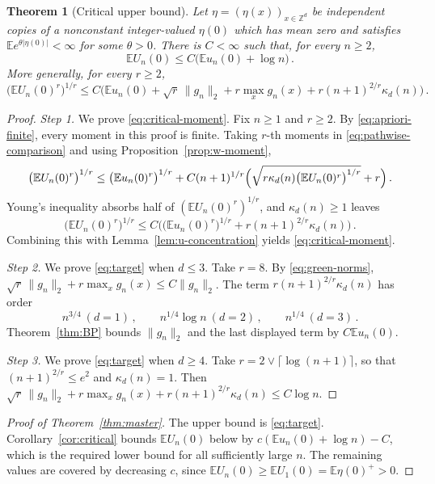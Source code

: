 \documentclass[11pt]{amsart}
\theoremstyle{plain}
\newtheorem{theorem}{Theorem}[section]
\theoremstyle{definition}
\newcommand{\Z}{\mathbb{Z}}
\newcommand{\E}{\mathbb{E}}
\begin{document}
\begin{theorem}[Critical upper bound]\label{thm:upper}
	Let $\eta=(\eta(x))_{x\in\Z^d}$ be independent copies of a nonconstant integer-valued
	$\eta(0)$ which has mean zero and satisfies $\E e^{\theta|\eta(0)|}<\infty$ for
	some $\theta>0$. There is $C<\infty$ such that, for every $n\geq2$,
	\begin{equation}\label{eq:target}
		\E U_n(0)\leq C\bigl(\E u_n(0)+\log n\bigr)\,.
	\end{equation}
	More generally, for every $r\geq2$,
	\begin{equation}\label{eq:critical-moment}
		\bigl(\E U_n(0)^r\bigr)^{1/r}
		\leq C\bigl(\E u_n(0)+\sqrt r\,\|g_n\|_2+r\max_xg_n(x)
		+r(n+1)^{2/r}\kappa_d(n)\bigr)\,.
	\end{equation}
\end{theorem}

\begin{proof}
	\smallskip
	\noindent\emph{Step 1.} We prove \eqref{eq:critical-moment}.
	Fix $n\geq1$ and $r\geq2$. By \eqref{eq:apriori-finite}, every
	moment in this proof is finite. Taking $r$-th moments in
	\eqref{eq:pathwise-comparison} and using Proposition~\ref{prop:w-moment},
	\[
		\bigl(\E U_n(0)^r\bigr)^{1/r}\leq\bigl(\E u_n(0)^r\bigr)^{1/r}
		+C(n+1)^{1/r}
		\Bigl(\sqrt{r\kappa_d(n)\bigl(\E U_n(0)^r\bigr)^{1/r}}+r\Bigr)\,.
	\]
	Young's inequality absorbs half of $(\E U_n(0)^r)^{1/r}$, and
	$\kappa_d(n)\geq1$ leaves
	\[
		\bigl(\E U_n(0)^r\bigr)^{1/r}\leq
		C\bigl(\bigl(\E u_n(0)^r\bigr)^{1/r}
		+r(n+1)^{2/r}\kappa_d(n)\bigr)\,.
	\]
	Combining this with Lemma~\ref{lem:u-concentration} yields
	\eqref{eq:critical-moment}.

	\smallskip
	\noindent\emph{Step 2.} We prove \eqref{eq:target} when $d\leq3$.
	Take $r=8$. By \eqref{eq:green-norms},
	$\sqrt r\,\|g_n\|_2+r\max_xg_n(x)\leq C\|g_n\|_2$. The term
	$r(n+1)^{2/r}\kappa_d(n)$ has order
	\[
		n^{3/4}\ (d=1)\,,\qquad n^{1/4}\log n\ (d=2)\,,\qquad n^{1/4}\ (d=3)\,.
	\]
	Theorem~\ref{thm:BP} bounds $\|g_n\|_2$ and the last displayed term by
	$C\E u_n(0)$.

	\smallskip
	\noindent\emph{Step 3.} We prove \eqref{eq:target} when $d\geq4$.
	Take
	$r=2\vee\lceil\log(n+1)\rceil$, so that $(n+1)^{2/r}\leq e^2$
	and $\kappa_d(n)=1$. Then
	$\sqrt r\,\|g_n\|_2+r\max_xg_n(x)+r(n+1)^{2/r}\kappa_d(n)\leq C\log n$.
\end{proof}

\begin{proof}[Proof of Theorem~\ref{thm:master}]
	The upper bound is \eqref{eq:target}. Corollary~\ref{cor:critical} bounds
	$\E U_n(0)$ below by $c(\E u_n(0)+\log n)-C$, which is the required lower
	bound for all sufficiently large $n$. The remaining values are covered by
	decreasing $c$, since
	$\E U_n(0)\geq\E U_1(0)=\E\eta(0)^+>0$.
\end{proof}
\end{document}
